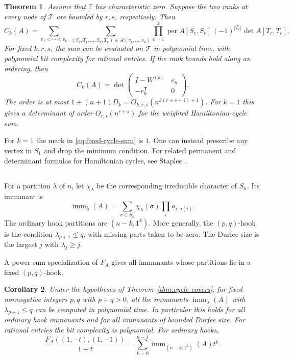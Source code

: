 \documentclass[11pt,reqno]{amsart}
\newtheorem{theorem}{Theorem}[section]
\newtheorem{corollary}[theorem]{Corollary}
\theoremstyle{remark}
\numberwithin{equation}{section}
\newcommand{\per}{\operatorname{per}}
\newcommand{\imm}{\operatorname{imm}}
\newcommand{\F}{\mathbb F}
\begin{document}
\begin{theorem}\label{thm:fixed-cycles}
Assume that \(\F\) has characteristic zero. Suppose the two ranks at every node of \(\mathcal T\) are bounded
by \(r,s\), respectively. Then
\begin{equation}\label{eq:fixed-cycle-sum}
 C_k(A)=\sum_{v_1<\cdots<v_k}\ 
       \sum_{(S_1,T_1,\ldots,S_k,T_k)\in\mathcal A(v_1,\ldots,v_k)}
       \prod_{c=1}^k
       \per A[S_c,S_c]\,(-1)^{|T_c|}\det A[T_c,T_c].
\end{equation}
For fixed \(k,r,s\), the sum can be evaluated on \(\mathcal T\)
in polynomial time, with polynomial bit complexity for rational
entries. If the rank bounds hold
along an ordering, then
\begin{equation}\label{eq:fixed-cycle-border}
 C_k(A)=\det\begin{pmatrix}
              I-W^{(k)} &e_n\\
              -e_0^{\mathsf T}&0
             \end{pmatrix}.
\end{equation}
The order is at most \(1+(n+1)D_k=O_{k,r,s}(n^{k(r+s-1)+1})\).
For \(k=1\) this gives a determinant of order
\(O_{r,s}(n^{r+s})\) for the weighted Hamiltonian-cycle sum.
\end{theorem}

For \(k=1\) the mark in \eqref{eq:fixed-cycle-sum} is \(1\).
One can instead prescribe any vertex in \(S_1\) and drop
the minimum condition. For related permanent and determinant
formulas for Hamiltonian cycles, see Staples \cite{Staples}.

\subsection{}

For a partition \(\lambda\) of \(n\), let \(\chi_\lambda\) be the
corresponding irreducible character of \(S_n\). Its immanant is
\[
 \imm_\lambda(A)=\sum_{\sigma\in S_n}
                   \chi_\lambda(\sigma)\prod_i a_{i,\sigma(i)} .
\]
The ordinary hook partitions are \((n-k,1^k)\). More generally,
the \((p,q)\)-hook is the condition \(\lambda_{p+1}\le q\), with
missing parts taken to be zero. The Durfee size is the largest
\(j\) with \(\lambda_j\ge j\).

A power-sum specialization of \(F_A\) gives all immanants
whose partitions lie in a fixed \((p,q)\)-hook.

\begin{corollary}\label{cor:hook-immanants}
Under the hypotheses of Theorem~\ref{thm:cycle-covers}, for fixed
nonnegative integers \(p,q\) with \(p+q>0\), all the immanants
\(\imm_\lambda(A)\) with \(\lambda_{p+1}\leq q\) can be computed
in polynomial time. In particular this holds for all ordinary
hook immanants and for all immanants of bounded Durfee size.
For rational entries the bit complexity is polynomial.
For ordinary hooks,
\begin{equation}\label{eq:ordinary-hooks}
 \frac{F_A((1,-t),(1,-1))}{1+t}
     =\sum_{k=0}^{n-1}\imm_{(n-k,1^k)}(A)t^k .
\end{equation}
\end{corollary}
\end{document}
